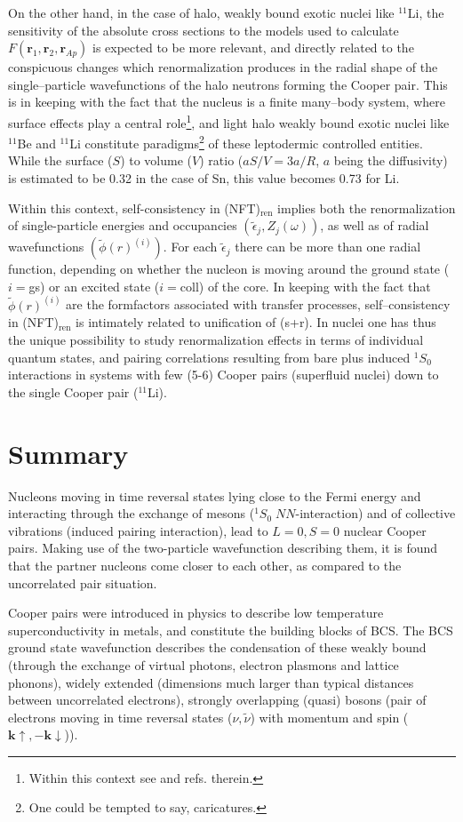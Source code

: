 On the other hand, in the case of halo, weakly bound exotic nuclei like $^{11}$Li, the sensitivity of the absolute cross sections to the models used to calculate $F(\mathbf r_1,\mathbf r_2,\mathbf r_{Ap})$ is expected to be more relevant, and directly related to the conspicuous changes which renormalization produces in the radial shape of the single--particle wavefunctions of the halo neutrons forming the Cooper pair. This is in keeping with  the fact that the nucleus is a finite many--body system, where surface effects play a central role\footnote{Within this context see \cite{Broglia:02d} and refs. therein.}, and light halo weakly bound exotic nuclei like $^{11}$Be and $^{11}$Li constitute paradigms\footnote{One could be tempted to say, caricatures.} of these leptodermic controlled entities.  While the surface ($S$) to volume ($V$) ratio ($aS/V=3a/R$, $a$ being the diffusivity) is estimated to be 0.32 in the case of Sn, this value becomes 0.73 for Li.

Within this context, self-consistency in (NFT)$_{\text{ren}}$ implies both the renormalization of single-particle energies and occupancies $(\tilde\epsilon_j,Z_j(\omega))$, as well as of radial wavefunctions $(\tilde\phi(r)^{(i)})$. For each $\tilde\epsilon_j$ there can be more than one radial function, depending on whether the nucleon is moving around the ground state ($i=$gs) or an excited state ($i=$coll) of the core. In keeping with the fact that $\tilde{\phi}(r)^{(i)}$ are the formfactors associated with transfer processes, self--consistency in (NFT)$_{\text{ren}}$ is intimately related to unification of (s+r). In nuclei one has thus the unique possibility to study renormalization effects in terms of individual quantum states, and pairing correlations resulting from bare plus induced $^1S_0$ interactions in systems with few (5-6) Cooper pairs (superfluid nuclei) down to the single Cooper pair ($^{11}$Li).
 \section{Summary}
Nucleons moving in time reversal states lying close to the Fermi energy and interacting through the exchange of mesons ($^1S_0\;NN$-interaction) and of collective vibrations (induced pairing interaction), lead to $L=0, S=0$ nuclear Cooper pairs. Making use of the two-particle wavefunction describing them, it is found that the partner nucleons come closer to each other, as compared to the uncorrelated pair situation.

Cooper pairs were introduced in physics to describe low temperature superconductivity in metals, and constitute the building blocks of BCS. The BCS ground state wavefunction describes the condensation of these weakly bound (through the exchange of virtual photons, electron plasmons and lattice phonons), widely extended (dimensions much larger than typical distances between uncorrelated electrons), strongly overlapping (quasi) bosons (pair of electrons moving in time reversal states ($\nu,\tilde \nu$) with momentum and spin ($\mathbf k\uparrow,-\mathbf k\downarrow$)).

